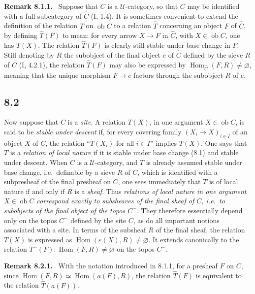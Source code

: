 \documentclass[11pt]{article}
\newcommand{\U}{\mathcal{U}}
\newcommand{\Hom}{\operatorname{Hom}}
\newcommand{\ob}{\operatorname{ob}}
\newcommand{\ie}{i.e.}
\newenvironment{remarktext}[1]{\par\medskip\noindent\textbf{#1.}\ }{\par\medskip}
\begin{document}
\begin{remarktext}{Remark 8.1.1}
Suppose that \(C\) is a \(\U\)-category, so that \(C\) may be identified with a full subcategory of \(\widehat C\) (I, 1.4). It is sometimes convenient to extend the definition of the relation \(T\) on \(\ob C\) to a relation \(\widehat T\) concerning an object \(F\) of \(\widehat C\), by defining \(\widehat T(F)\) to mean: for every arrow \(X\to F\) in \(\widehat C\), with \(X\in\ob C\), one has \(T(X)\). The relation \(\widehat T(F)\) is clearly still stable under base change in \(F\). Still denoting by \(R\) the subobject of the final object \(e\) of \(\widehat C\) defined by the sieve \(R\) of \(C\) (I, 4.2.1), the relation \(\widehat T(F)\) may also be expressed by \(\Hom_{\widehat C}(F,R)\ne\varnothing\), meaning that the unique morphism \(F\to e\) factors through the subobject \(R\) of \(e\).
\end{remarktext}

\subsection*{8.2}
Now suppose that \(C\) is a \emph{site}. A relation \(T(X)\), in one argument \(X\in\ob C\), is said to be \emph{stable under descent} if, for every covering family \((X_i\to X)_{i\in I}\) of an object \(X\) of \(C\), the relation ``\(T(X_i)\) for all \(i\in I\)'' implies \(T(X)\). One says that \(T\) is a \emph{relation of local nature} if it is stable under base change (8.1) and stable under descent. When \(C\) is a \(\U\)-category, and \(T\) is already assumed stable under base change, \ie\ definable by a sieve \(R\) of \(C\), which is identified with a subpresheaf of the final presheaf on \(C\), one sees immediately that \(T\) is of local nature if and only if \(R\) is a \emph{sheaf}. Thus \emph{relations of local nature in one argument \(X\in\ob C\) correspond exactly to subsheaves of the final sheaf of \(C\), \ie\ to subobjects of the final object of the topos \(C^{\sim}\).} They therefore essentially depend only on the topos \(C^{\sim}\) defined by the site \(C\), as do all important notions associated with a site. In terms of the subsheaf \(R\) of the final sheaf, the relation \(T(X)\) is expressed as \(\Hom(\varepsilon(X),R)\ne\varnothing\). It extends canonically to the relation \(T^{\sim}(F):\Hom(F,R)\ne\varnothing\) on the topos \(C^{\sim}\).

\begin{remarktext}{Remark 8.2.1}
With the notation introduced in 8.1.1, for a presheaf \(F\) on \(C\), since \(\Hom(F,R)\simeq\Hom(a(F),R)\), the relation \(\widehat T(F)\) is equivalent to the relation \(\widehat T(a(F))\).
\end{remarktext}
\end{document}

